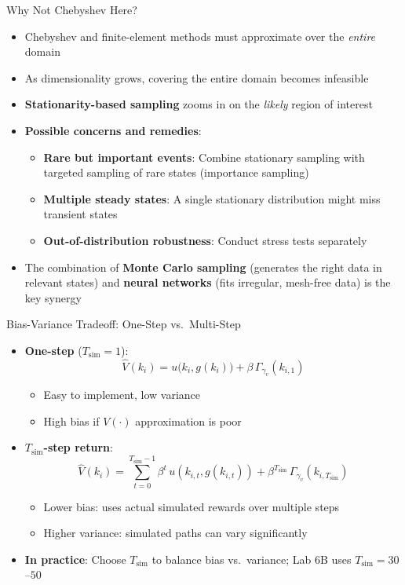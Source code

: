 \documentclass[10pt,english,aspectratio=169]{beamer}
\begin{document}
\begin{frame}{Why Not Chebyshev Here?}
\begin{itemize}
  \item Chebyshev and finite-element methods must approximate over the \emph{entire} domain
  \item As dimensionality grows, covering the entire domain becomes infeasible
  \medskip
  \item \textbf{Stationarity-based sampling} zooms in on the \emph{likely} region of interest
  \medskip
  \item \textbf{Possible concerns and remedies}:
    \begin{itemize}
      \item \textbf{Rare but important events}: Combine stationary sampling with targeted sampling of rare states (importance sampling)
      \item \textbf{Multiple steady states}: A single stationary distribution might miss transient states
      \item \textbf{Out-of-distribution robustness}: Conduct stress tests separately
    \end{itemize}
  \medskip
  \item The combination of \textbf{Monte Carlo sampling} (generates the right data in relevant states) and \textbf{neural networks} (fits irregular, mesh-free data) is the key synergy
\end{itemize}
\end{frame}

\begin{frame}{Bias-Variance Tradeoff: One-Step vs.\ Multi-Step}
\begin{itemize}
  \item \textbf{One-step} ($T_{\text{sim}} = 1$):
    \[
      \hat{V}(k_i) = u\bigl(k_i, g(k_i)\bigr) + \beta\, \Gamma_{\gamma_v}(k_{i,1})
    \]
    \begin{itemize}
      \item[$+$] Easy to implement, low variance
      \item[$-$] High bias if $V(\cdot)$ approximation is poor
    \end{itemize}
  \medskip
  \item \textbf{$T_{\text{sim}}$-step return}:
    \[
      \hat{V}(k_i) = \sum_{t=0}^{T_{\text{sim}}-1} \beta^t\, u(k_{i,t}, g(k_{i,t})) + \beta^{T_{\text{sim}}}\, \Gamma_{\gamma_v}(k_{i,T_{\text{sim}}})
    \]
    \begin{itemize}
      \item[$+$] Lower bias: uses actual simulated rewards over multiple steps
      \item[$-$] Higher variance: simulated paths can vary significantly
    \end{itemize}
  \medskip
  \item \textbf{In practice}: Choose $T_{\text{sim}}$ to balance bias vs.\ variance; Lab 6B uses $T_{\text{sim}} = 30$--$50$
\end{itemize}
\end{frame}
\end{document}
